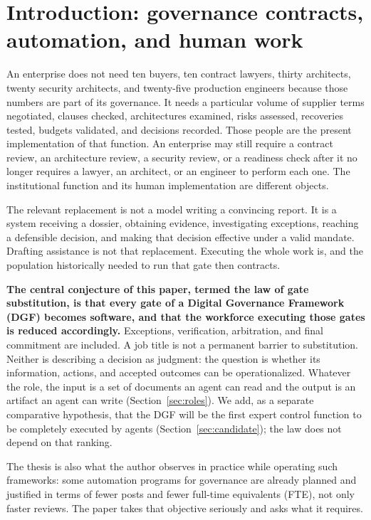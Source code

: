 \section{Introduction: governance contracts, automation, and human work}
\label{sec:intro}

An enterprise does not need ten buyers, ten contract lawyers, thirty architects, twenty
security architects, and twenty-five production engineers because those numbers are part of its
governance. It needs a particular volume of supplier terms negotiated, clauses checked, architectures
examined, risks assessed, recoveries tested, budgets validated, and decisions recorded. Those people
are the present implementation of that function. An enterprise may still require a contract review, an
architecture review, a security review, or a readiness check after it no longer requires a lawyer, an
architect, or an engineer to perform each one. The institutional function and its human implementation are
different objects.

The relevant replacement is not a model writing a convincing report. It is a system receiving a
dossier, obtaining evidence, investigating exceptions, reaching a defensible decision, and making that
decision effective under a valid mandate. Drafting assistance is not that replacement. Executing the whole work is, and the population
historically needed to run that gate then contracts.

\textbf{The central conjecture of this paper, termed the law of gate substitution, is that every gate of a Digital Governance
Framework (DGF) becomes software, and that the workforce executing those gates is reduced
accordingly.} Exceptions, verification, arbitration, and final commitment are included. A job title is not a
permanent barrier to substitution. Neither is describing a decision as judgment: the question is
whether its information, actions, and accepted outcomes can be operationalized. Whatever the role, the
input is a set of documents an agent can read and the output is an artifact an agent can write
(Section~\ref{sec:roles}). We add, as a separate comparative hypothesis, that the DGF will be the first expert control function to
be completely executed by agents (Section~\ref{sec:candidate}); the law does not depend on that
ranking.

The thesis is also what the author observes in practice while operating such frameworks: some automation programs for governance are already planned and justified in terms of fewer posts and
fewer full-time equivalents (FTE), not only faster reviews. The paper takes that objective seriously
and asks what it requires.

